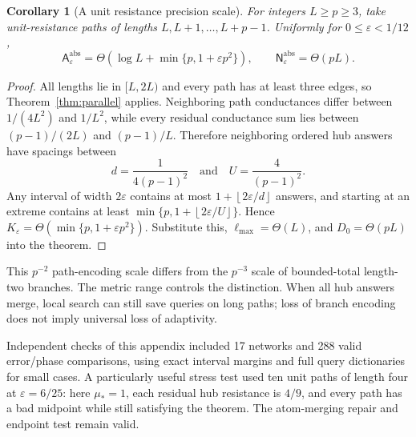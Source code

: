 \documentclass[11pt,letterpaper]{article}
\newtheorem{corollary}[theorem]{Corollary}
\newcommand{\floor}[1]{\left\lfloor #1\right\rfloor}
\newcommand{\A}{\mathsf A}
\newcommand{\N}{\mathsf N}
\begin{document}
\begin{corollary}[A unit resistance precision scale]\label{cor:unitprecision}
For integers $L\ge p\ge3$, take unit-resistance paths of lengths $L,L+1,\ldots,L+p-1$. Uniformly for $0\le\varepsilon<1/12$,
\[
 \A^{\mathrm{abs}}_\varepsilon
 =\Theta\!\left(\log L+\min\{p,1+\varepsilon p^2\}\right),
 \qquad
 \N^{\mathrm{abs}}_\varepsilon=\Theta(pL).
\]
\end{corollary}
\begin{proof}
All lengths lie in $[L,2L)$ and every path has at least three edges, so Theorem~\ref{thm:parallel} applies. Neighboring path conductances differ between $1/(4L^2)$ and $1/L^2$, while every residual conductance sum lies between $(p-1)/(2L)$ and $(p-1)/L$. Therefore neighboring ordered hub answers have spacings between
\[
 d=\frac1{4(p-1)^2}\quad\text{and}\quad U=\frac4{(p-1)^2}.
\]
Any interval of width $2\varepsilon$ contains at most $1+\floor{2\varepsilon/d}$ answers, and starting at an extreme contains at least $\min\{p,1+\floor{2\varepsilon/U}\}$. Hence $K_\varepsilon=\Theta(\min\{p,1+\varepsilon p^2\})$. Substitute this, $\ell_{\max}=\Theta(L)$, and $D_0=\Theta(pL)$ into the theorem.
\end{proof}

This $p^{-2}$ path-encoding scale differs from the $p^{-3}$ scale of bounded-total length-two branches. The metric range controls the distinction. When all hub answers merge, local search can still save queries on long paths; loss of branch encoding does not imply universal loss of adaptivity.

Independent checks of this appendix included 17 networks and 288 valid error/phase comparisons, using exact interval margins and full query dictionaries for small cases. A particularly useful stress test used ten unit paths of length four at $\varepsilon=6/25$: here $\mu_*=1$, each residual hub resistance is $4/9$, and every path has a bad midpoint while still satisfying the theorem. The atom-merging repair and endpoint test remain valid.
\end{document}
